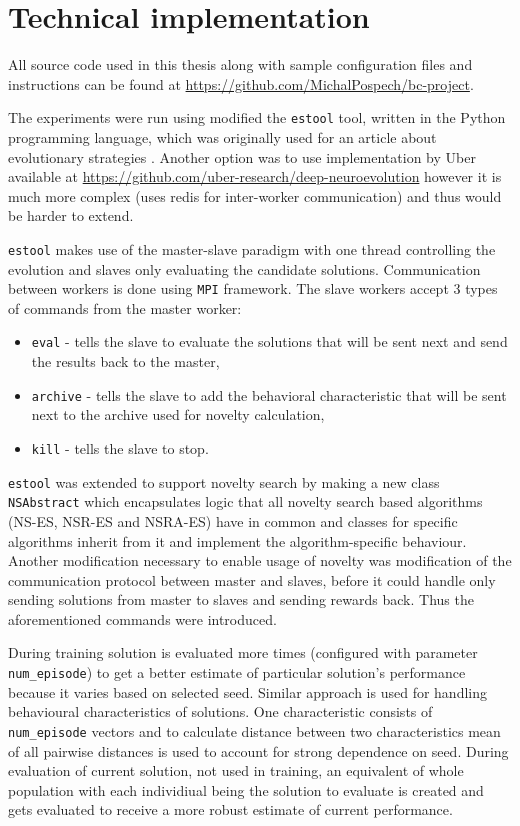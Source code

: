 \chapter{Technical implementation}

All source code used in this thesis along with sample configuration files and instructions can be found at \url{https://github.com/MichalPospech/bc-project}.

The experiments were run using modified the \texttt{estool} tool, written in the Python programming language, which was originally used for an article about evolutionary strategies \cite{ha2017evolving}. Another option was to use implementation by Uber available at \url{https://github.com/uber-research/deep-neuroevolution} however it is much more complex (uses redis for inter-worker communication) and thus would be harder to extend.

\texttt{estool} makes use of the master-slave paradigm with one thread controlling the evolution and slaves only evaluating the candidate solutions. Communication between workers is done using \texttt{MPI} framework. The slave workers accept 3 types of commands from the master worker: \begin{itemize}
    \item \texttt{eval} - tells the slave to evaluate the solutions that will be sent next and send the results back to the master,
    \item \texttt{archive} - tells the slave to add the behavioral characteristic that will be sent next to the archive used for novelty calculation,
    \item \texttt{kill} - tells the slave to stop.
\end{itemize}

\texttt{estool} was extended to support novelty search by making a new class \texttt{NSAbstract} which encapsulates logic that all novelty search based algorithms (NS-ES, NSR-ES and NSRA-ES) have in common and classes for specific algorithms inherit from it and implement the algorithm-specific behaviour. Another modification necessary to enable usage of novelty was modification of the communication protocol between master and slaves, before it could handle only sending solutions from master to slaves and sending rewards back. Thus the aforementioned commands were introduced.

During training solution is evaluated more times (configured with parameter \texttt{num\_episode}) to get a better estimate of particular solution's performance because it varies based on selected seed. Similar approach is used for handling behavioural characteristics of solutions. One characteristic consists of \texttt{num\_episode} vectors and to calculate distance between two characteristics mean of all pairwise distances is used to account for strong dependence on seed. During evaluation of current solution, not used in training, an equivalent of whole population with each individiual being the solution to evaluate is created and gets evaluated to receive a more robust estimate of current performance.

